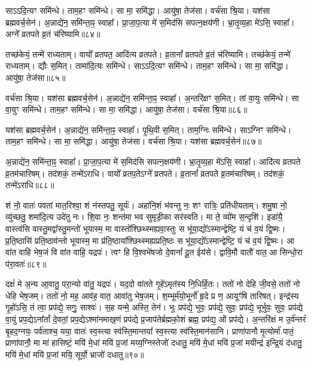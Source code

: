 साऽऽदि॒त्यꣳ समि॑न्धे। 
ताम॒हꣳ समि॑न्धे। 
सा मा॒ समि॑द्धा। 
आयु॑षा॒ तेज॑सा। 
वर्च॑सा श्रि॒या। 
यश॑सा ब्रह्मवर्च॒सेन॑। 
अ॒न्नाद्ये॑न॒ समि॑न्ता॒ꣴ॒ स्वाहा᳚। 
प्रा॒जा॒प॒त्या मे॑ स॒मिद॑सि सपत्न॒क्षय॑णी। 
भ्रा॒तृ॒व्य॒हा मे॑ऽसि॒ स्वाहा᳚। 
अग्ने᳚ व्रतपते व्र॒तं च॑रिष्यामि॥८४॥

तच्छ॑केयं॒ तन्मे॑ राध्यताम्। 
वायो᳚ व्रतपत॒ आदि॑त्य व्रतपते। 
व्र॒तानां᳚ व्रतपते व्र॒तं च॑रिष्यामि। 
तच्छ॑केयं॒ तन्मे॑ राध्यताम्। 
द्यौः स॒मित्। 
तामा॑दि॒त्यः समि॑न्धे। 
साऽऽदि॒त्यꣳ समि॑न्धे। 
ताम॒हꣳ समि॑न्धे। 
सा मा॒ समि॑द्धा। 
आयु॑षा॒ तेज॑सा॥८५॥

वर्च॑सा श्रि॒या। 
यश॑सा ब्रह्मवर्च॒सेन॑। 
अ॒न्नाद्ये॑न॒ समि॑न्ता॒ꣴ॒ स्वाहा᳚। 
अ॒न्तरि॑क्षꣳ स॒मित्। 
तां वा॒युः समि॑न्धे। 
सा वा॒युꣳ समि॑न्धे। 
ताम॒हꣳ समि॑न्धे। 
सा मा॒ समि॑द्धा। 
आयु॑षा॒ तेज॑सा। 
वर्च॑सा श्रि॒या॥८६॥

यश॑सा ब्रह्मवर्च॒सेन॑। 
अ॒न्नाद्ये॑न॒ समि॑न्ता॒ꣴ॒ स्वाहा᳚। 
पृ॒थि॒वी स॒मित्। 
ताम॒ग्निः समि॑न्धे। 
साऽग्निꣳ समि॑न्धे। 
ताम॒हꣳ समि॑न्धे। 
सा मा॒ समि॑द्धा। 
आयु॑षा॒ तेज॑सा। 
वर्च॑सा श्रि॒या। 
यश॑सा ब्रह्मवर्च॒सेन॑॥८७॥

अ॒न्नाद्ये॑न॒ समि॑न्ता॒ꣴ॒ स्वाहा᳚। 
प्रा॒जा॒प॒त्या मे॑ स॒मिद॑सि सपत्न॒क्षय॑णी। 
भ्रा॒तृ॒व्य॒हा मे॑ऽसि॒ स्वाहा᳚। 
आदि॑त्य व्रतपते व्र॒तम॑चारिषम्। 
तद॑शकं॒ तन्मे॑ऽराधि। 
वायो᳚ व्रतप॒तेऽग्ने᳚ व्रतपते। 
व्र॒तानां᳚ व्रतपते व्र॒तम॑चारिषम्। 
तद॑शकं॒ तन्मे॑ऽराधि॥८८॥
\anuvakamend[स॒मिथ्समि॑न्धे व्र॒तं च॑रिष्या॒म्यायु॑षा॒ तेज॑सा॒ वर्च॑सा श्रि॒या यश॑सा ब्रह्मवर्च॒सेना॒ष्टौ च॑]


शं नो॒ वातः॑ पवतां मात॒रिश्वा॒ शं न॑स्तपतु॒ सूर्यः॑। 
अहा॑नि॒शं भ॑वन्तु नः॒ शꣳ रात्रिः॒ प्रति॑धीयताम्। 
शमु॒षा नो॒ व्यु॑च्छतु॒ शमा॑दि॒त्य उदे॑तु नः। 
शि॒वा नः॒ शन्त॑मा भव सुमृडी॒का सर॑स्वति। 
मा ते॒ व्यो॑म स॒न्दृशि॑। 
इडा॑यै॒ वास्त्व॑सि वास्तु॒मद्वा᳚स्तु॒मन्तो॑ भूयास्म॒ मा वास्तो᳚श्छिथ्स्मह्यवा॒स्तुः स भू॑या॒द्यो᳚ऽस्मान्द्वेष्टि॒ यं च॑ व॒यं द्वि॒ष्मः। 
प्र॒ति॒ष्ठासि॑ प्रति॒ष्ठाव॑न्तो भूयास्म॒ मा प्र॑ति॒ष्ठाया᳚श्छिथ्स्मह्यप्रति॒ष्ठः स भू॑या॒द्यो᳚ऽस्मान्द्वेष्टि॒ यं च॑ व॒यं द्वि॒ष्मः। 
आ वा॑त वाहि भेष॒जं वि वा॑त वाहि॒ यद्रपः॑। 
त्वꣳ हि वि॒श्वभे॑षजो दे॒वानां᳚ दू॒त ईय॑से। 
द्वावि॒मौ वातौ॑ वात॒ आ सिन्धो॒रा प॑रा॒वतः॑॥८९॥

दक्षं॑ मे अ॒न्य आ॒वातु॒ परा॒न्यो वा॑तु॒ यद्रपः॑। 
यद॒दो वा॑तते गृ॒हे॑ऽमृत॑स्य नि॒धिर्\mbox{}हि॒तः। 
ततो॑ नो देहि जी॒वसे॒ ततो॑ नो धेहि भेष॒जम्। 
ततो॑ नो॒ मह॒ आव॑ह॒ वात॒ आवा॑तु भेष॒जम्। 
श॒म्भूर्म॑यो॒भूर्नो॑ हृ॒दे प्र ण॒ आयूꣳ॑षि तारिषत्। 
इन्द्र॑स्य गृ॒हो॑ऽसि॒ तं त्वा॒ प्रप॑द्ये॒ सगुः॒ साश्वः॑। 
स॒ह यन्मे॒ अस्ति॒ तेन॑। 
भूः प्रप॑द्ये॒ भुवः॒ प्रप॑द्ये॒ सुवः॒ प्रप॑द्ये॒ भूर्भुवः॒ सुवः॒ प्रप॑द्ये वा॒युं प्रप॒द्येऽना᳚र्तां दे॒वतां॒ प्रप॒द्येऽश्मा॑नमाख॒णं प्रप॑द्ये प्र॒जाप॑तेर्ब्रह्मको॒शं ब्रह्म॒ प्रप॑द्य॒ ओं प्रप॑द्ये। 
अ॒न्तरि॑क्षं म उ॒र्व॑न्तरं॑ बृ॒हद॒ग्नयः॒ पर्व॑ताश्च॒ यया॒ वातः॑ स्व॒स्त्या स्व॑स्ति॒मान्तया᳚ स्व॒स्त्या स्व॑स्ति॒मान॑सानि। 
प्राणा॑पानौ मृ॒त्योर्मा॑ पातं॒ प्राणा॑पानौ॒ मा मा॑ हासिष्टं॒ मयि॑ मे॒धां मयि॑ प्र॒जां मय्य॒ग्निस्तेजो॑ दधातु॒ मयि॑ मे॒धां मयि॑ प्र॒जां मयीन्द्र॑ इन्द्रि॒यं द॑धातु॒ मयि॑ मे॒धां मयि॑ प्र॒जां मयि॒ सूर्यो॒ भ्राजो॑ दधातु॥९०॥

